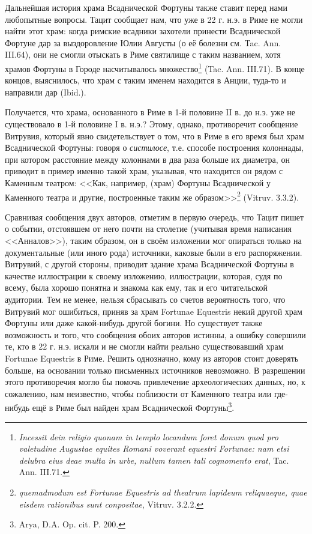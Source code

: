 

Дальнейшая история храма Всаднической Фортуны также ставит перед нами любопытные вопросы. Тацит сообщает нам, что уже в 22 г. н.э. в Риме не могли найти этот храм: когда римские всадники захотели принести Всаднической Фортуне дар за выздоровление Юлии Августы (о её болезни см. Tac. Ann. III.64), они не смогли отыскать в Риме святилище с таким названием, хотя храмов Фортуны в Городе насчитывалось множество\footnote{\textit{Incessit dein religio quonam in templo locandum foret donum quod pro valetudine Augustae equites Romani voverant equestri Fortunae: nam etsi delubra eius deae multa in urbe, nullum tamen tali cognomento erat}, Tac. Ann. III.71.} (Tac. Ann. III.71). В конце концов, выяснилось, что храм с таким именем находится в Анции, туда-то и направили дар (Ibid.).

Получается, что храма, основанного в Риме в 1-й половине II в. до н.э. уже не существовало в 1-й половине I в. н.э.? Этому, однако, противоречит сообщение Витрувия, который явно свидетельствует о том, что в Риме в его время был храм Всаднической Фортуны: говоря о \textit{систилосе}, т.е. способе построения колоннады, при котором расстояние между колоннами в два раза больше их диаметра, он приводит в пример именно такой храм, указывая, что находится он рядом с Каменным театром: <<Как, например, (храм) Фортуны Всаднической у Каменного театра и другие, построенные таким же образом>>\footnote{\textit{quemadmodum est Fortunae Equestris ad theatrum lapideum reliquaeque, quae eisdem rationibus sunt conpositae}, Vitruv. 3.2.2.} (Vitruv. 3.3.2).

Сравнивая сообщения двух авторов, отметим в первую очередь, что Тацит пишет о событии, отстоявшем от него почти на столетие (учитывая время написания <<Анналов>>), таким образом, он в своём изложении мог опираться только на документальные (или иного рода) источники, каковые были в его распоряжении. Витрувий, с другой стороны, приводит здание храма Всаднической Фортуны в качестве иллюстрации к своему изложению, иллюстрации, которая, судя по всему, была хорошо понятна и знакома как ему, так и его читательской аудитории. Тем не менее, нельзя сбрасывать со счетов вероятность того, что Витрувий мог ошибиться, приняв за храм Fortunae Equestris некий другой храм Фортуны или даже какой-нибудь другой богини. Но существует также возможность и того, что сообщения обоих авторов истинны, а ошибку совершили те, кто в 22 г. н.э. искали и не смогли найти реально существовавший храм Fortunae Equestris в Риме. Решить однозначно, кому из авторов стоит доверять больше, на основании только письменных источников невозможно. В разрешении этого противоречия могло бы помочь привлечение археологических данных, но, к сожалению, нам неизвестно, чтобы поблизости от Каменного театра или где-нибудь ещё в Риме был найден храм Всаднической Фортуны\footnote{Arya, D.A. Op. cit. P. 200.}.


